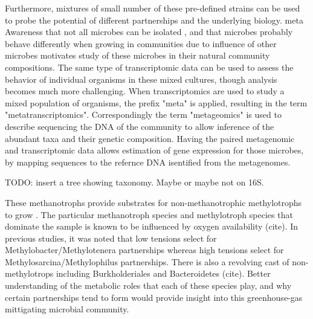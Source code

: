 Furthermore, mixtures of small number of these pre-defined strains can be used to probe the potential of different partnerships and the underlying biology.
meta
Awareness that not all microbes can be isolated \cite{kaeberlein2002, stewart2012}, and that microbes probably behave differently when growing in communities due to influence of other microbes motivates study of these microbes in their natural community compositions.
The same type of transcriptomic data can be used to assess the behavior of individual organisms in these mixed cultures, though analysis becomes much more challenging.
When transcriptomics are used to study a mixed population of organisms, the prefix "meta" is applied, resulting in the term "metatranscriptomics".
Correspondingly the term "metageomics" is used to describe sequencing the DNA of the community to allow inference of the abundant taxa and their genetic composition.
Having the paired metagenomic and transcriptomic data allows estimation of gene expression for those microbes, by mapping sequences to the refernce DNA isentified from the metagenomes.


TODO: insert a tree showing taxonomy.  Maybe or maybe not on 16S.

These methanotrophs provide substrates for non-methanotrophic methylotrophs to grow \cite{beck2013LW}.
The particular methanotroph species and methylotroph species that dominate the sample is known to be influenced by oxygen availability (cite).
In previous studies, it was noted that low  tensions select for Methylobacter/Methylotenera partnerships whereas high  tensions select for Methylosarcina/Methylophilus partnerships.
There is also a revolving cast of non-methylotrops including Burkholderiales and Bacteroidetes (cite).
Better understanding of the metabolic roles that each of these species play, and why certain partnerships tend to form would provide insight into this greenhouse-gas mittigating microbial community.

